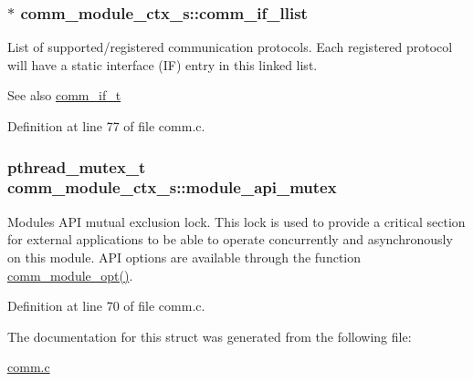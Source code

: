 \subsubsection[{\texorpdfstring{comm\+\_\+if\+\_\+llist}{comm_if_llist}}]{$\ast$ comm\+\_\+module\+\_\+ctx\+\_\+s\+::comm\+\_\+if\+\_\+llist}\hypertarget{structcomm__module__ctx__s_aca7d8c9e08de7feabe5818c35abd2244}{}\label{structcomm__module__ctx__s_aca7d8c9e08de7feabe5818c35abd2244}
List of supported/registered communication protocols. Each registered protocol will have a static interface (IF) entry in this linked list. \begin{DoxySeeAlso}{See also}
\hyperlink{comm_8h_a0d96b9368107e517ea8253837384faf5}{comm\+\_\+if\+\_\+t} 
\end{DoxySeeAlso}


Definition at line 77 of file comm.\+c.

\subsubsection[{\texorpdfstring{module\+\_\+api\+\_\+mutex}{module_api_mutex}}]{\setlength{\rightskip}{0pt plus 5cm}pthread\+\_\+mutex\+\_\+t comm\+\_\+module\+\_\+ctx\+\_\+s\+::module\+\_\+api\+\_\+mutex}\hypertarget{structcomm__module__ctx__s_a065cf60f09cc13971556a494dc35425f}{}\label{structcomm__module__ctx__s_a065cf60f09cc13971556a494dc35425f}
Module\textquotesingle{}s A\+PI mutual exclusion lock. This lock is used to provide a critical section for external applications to be able to operate concurrently and asynchronously on this module. A\+PI options are available through the function \hyperlink{comm_8c_a21edd1aa9b38d7eadecb70b5f963f437}{comm\+\_\+module\+\_\+opt()}. 

Definition at line 70 of file comm.\+c.



The documentation for this struct was generated from the following file\+:\begin{DoxyCompactItemize}
\item 
\hyperlink{comm_8c}{comm.\+c}\end{DoxyCompactItemize}
